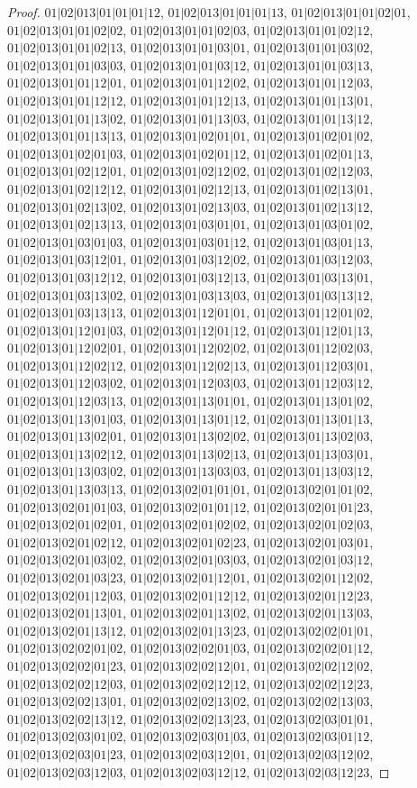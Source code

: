 \documentclass[12pt]{article}
\theoremstyle{plain}
\theoremstyle{definition}
\theoremstyle{remark}
\begin{document}
\begin{proof}
$01|02|013|01|01|01|12$, $01|02|013|01|01|01|13$, $01|02|013|01|01|02|01$, $01|02|013|01|01|02|02$, $01|02|013|01|01|02|03$, $01|02|013|01|01|02|12$, $01|02|013|01|01|02|13$, $01|02|013|01|01|03|01$, $01|02|013|01|01|03|02$, $01|02|013|01|01|03|03$, $01|02|013|01|01|03|12$, $01|02|013|01|01|03|13$, $01|02|013|01|01|12|01$, $01|02|013|01|01|12|02$, $01|02|013|01|01|12|03$, $01|02|013|01|01|12|12$, $01|02|013|01|01|12|13$, $01|02|013|01|01|13|01$, $01|02|013|01|01|13|02$, $01|02|013|01|01|13|03$, $01|02|013|01|01|13|12$, $01|02|013|01|01|13|13$, $01|02|013|01|02|01|01$, $01|02|013|01|02|01|02$, $01|02|013|01|02|01|03$, $01|02|013|01|02|01|12$, $01|02|013|01|02|01|13$, $01|02|013|01|02|12|01$, $01|02|013|01|02|12|02$, $01|02|013|01|02|12|03$, $01|02|013|01|02|12|12$, $01|02|013|01|02|12|13$, $01|02|013|01|02|13|01$, $01|02|013|01|02|13|02$, $01|02|013|01|02|13|03$, $01|02|013|01|02|13|12$, $01|02|013|01|02|13|13$, $01|02|013|01|03|01|01$, $01|02|013|01|03|01|02$, $01|02|013|01|03|01|03$, $01|02|013|01|03|01|12$, $01|02|013|01|03|01|13$, $01|02|013|01|03|12|01$, $01|02|013|01|03|12|02$, $01|02|013|01|03|12|03$, $01|02|013|01|03|12|12$, $01|02|013|01|03|12|13$, $01|02|013|01|03|13|01$, $01|02|013|01|03|13|02$, $01|02|013|01|03|13|03$, $01|02|013|01|03|13|12$, $01|02|013|01|03|13|13$, $01|02|013|01|12|01|01$, $01|02|013|01|12|01|02$, $01|02|013|01|12|01|03$, $01|02|013|01|12|01|12$, $01|02|013|01|12|01|13$, $01|02|013|01|12|02|01$, $01|02|013|01|12|02|02$, $01|02|013|01|12|02|03$, $01|02|013|01|12|02|12$, $01|02|013|01|12|02|13$, $01|02|013|01|12|03|01$, $01|02|013|01|12|03|02$, $01|02|013|01|12|03|03$, $01|02|013|01|12|03|12$, $01|02|013|01|12|03|13$, $01|02|013|01|13|01|01$, $01|02|013|01|13|01|02$, $01|02|013|01|13|01|03$, $01|02|013|01|13|01|12$, $01|02|013|01|13|01|13$, $01|02|013|01|13|02|01$, $01|02|013|01|13|02|02$, $01|02|013|01|13|02|03$, $01|02|013|01|13|02|12$, $01|02|013|01|13|02|13$, $01|02|013|01|13|03|01$, $01|02|013|01|13|03|02$, $01|02|013|01|13|03|03$, $01|02|013|01|13|03|12$, $01|02|013|01|13|03|13$, $01|02|013|02|01|01|01$, $01|02|013|02|01|01|02$, $01|02|013|02|01|01|03$, $01|02|013|02|01|01|12$, $01|02|013|02|01|01|23$, $01|02|013|02|01|02|01$, $01|02|013|02|01|02|02$, $01|02|013|02|01|02|03$, $01|02|013|02|01|02|12$, $01|02|013|02|01|02|23$, $01|02|013|02|01|03|01$, $01|02|013|02|01|03|02$, $01|02|013|02|01|03|03$, $01|02|013|02|01|03|12$, $01|02|013|02|01|03|23$, $01|02|013|02|01|12|01$, $01|02|013|02|01|12|02$, $01|02|013|02|01|12|03$, $01|02|013|02|01|12|12$, $01|02|013|02|01|12|23$, $01|02|013|02|01|13|01$, $01|02|013|02|01|13|02$, $01|02|013|02|01|13|03$, $01|02|013|02|01|13|12$, $01|02|013|02|01|13|23$, $01|02|013|02|02|01|01$, $01|02|013|02|02|01|02$, $01|02|013|02|02|01|03$, $01|02|013|02|02|01|12$, $01|02|013|02|02|01|23$, $01|02|013|02|02|12|01$, $01|02|013|02|02|12|02$, $01|02|013|02|02|12|03$, $01|02|013|02|02|12|12$, $01|02|013|02|02|12|23$, $01|02|013|02|02|13|01$, $01|02|013|02|02|13|02$, $01|02|013|02|02|13|03$, $01|02|013|02|02|13|12$, $01|02|013|02|02|13|23$, $01|02|013|02|03|01|01$, $01|02|013|02|03|01|02$, $01|02|013|02|03|01|03$, $01|02|013|02|03|01|12$, $01|02|013|02|03|01|23$, $01|02|013|02|03|12|01$, $01|02|013|02|03|12|02$, $01|02|013|02|03|12|03$, $01|02|013|02|03|12|12$, $01|02|013|02|03|12|23$, 
\end{proof}
\end{document}
